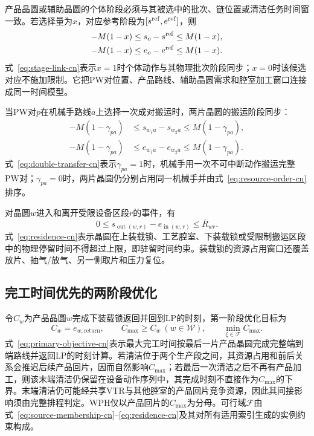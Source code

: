 \documentclass[journal]{IEEEtran}
\begin{document}
产品晶圆或辅助晶圆的个体阶段必须与其被选中的批次、链位置或清洁任务时间窗一致。若选择量为$x$，对应参考阶段为$[s^{\rm ref},e^{\rm ref}]$，则
\begin{equation}
\begin{aligned}
-M(1-x)&\le s_o-s^{\rm ref}\le M(1-x),\\
-M(1-x)&\le e_o-e^{\rm ref}\le M(1-x).
\end{aligned}
\label{eq:stage-link-cn}
\end{equation}
式~\eqref{eq:stage-link-cn}表示$x=1$时个体动作与其物理批次阶段同步；$x=0$时该候选对应不施加限制。它把PW对位置、产品路线、辅助晶圆需求和腔室加工窗口连接成同一时间模型。

当PW对$p$在机械手路线$a$上选择一次成对搬运时，两片晶圆的搬运阶段同步：
\begin{equation}
\begin{aligned}
-M(1-\gamma_{pa})&\le s_{w_1a}-s_{w_2a}\le M(1-\gamma_{pa}),\\
-M(1-\gamma_{pa})&\le e_{w_1a}-e_{w_2a}\le M(1-\gamma_{pa}).
\end{aligned}
\label{eq:double-transfer-cn}
\end{equation}
式~\eqref{eq:double-transfer-cn}表示$\gamma_{pa}=1$时，机械手用一次不可中断动作搬运完整PW对；$\gamma_{pa}=0$时，两片晶圆仍分别占用同一机械手并由式~\eqref{eq:resource-order-cn}排序。

对晶圆$w$进入和离开受限设备区段$r$的事件，有
\begin{equation}
0\le s_{\operatorname{out}(w,r)}-e_{\operatorname{in}(w,r)}
\le\overline R_{wr}.
\label{eq:residence-cn}
\end{equation}
式~\eqref{eq:residence-cn}表示晶圆在上装载锁、工艺腔室、下装载锁或受限制搬运区段中的物理停留时间不得超过上限，即驻留时间约束。装载锁的资源占用窗口还覆盖放片、抽气/放气、另一侧取片和压力复位。

\subsection{完工时间优先的两阶段优化}

令$C_w$为产品晶圆$w$完成下装载锁返回并回到LP的时刻，第一阶段优化目标为
\begin{equation}
C_w=e_{w,\mathrm{return}},\qquad
C_{\max}\ge C_w\ (w\in\mathcal W),\qquad
\min_{\xi\in\mathcal F}C_{\max}.
\label{eq:primary-objective-cn}
\end{equation}
式~\eqref{eq:primary-objective-cn}表示最大完工时间按最后一片产品晶圆完成完整端到端路线并返回LP的时刻计算。若清洁位于两个生产段之间，其资源占用和前后关系会推迟后续产品回片，因而自然影响$C_{\max}$；若最后一次清洁之后不再有产品加工，则该末端清洁仍保留在设备动作序列中，其完成时刻不直接作为$C_{\max}$的下界。末端清洁仍可能经共享VTR与其他腔室的产品回片竞争资源，因此其间接影响须由完整排程判定。WPH仅以产品回片的$C_{\max}$为分母。可行域$\mathcal F$由式~\eqref{eq:source-membership-cn}--\eqref{eq:residence-cn}及其对所有适用索引生成的实例约束构成。
\end{document}
